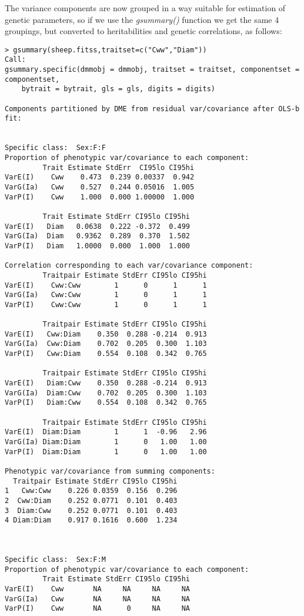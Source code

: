 \documentclass[titlepage]{article}  %
\begin{document}
The variance components are now grouped in a way suitable for estimation of genetic parameters, so if we use the {\em gsummary()} function we get the same 4 groupings, but converted to heritabilities and genetic correlations, as follows:

\begin{verbatim}
> gsummary(sheep.fitss,traitset=c("Cww","Diam"))
Call:
gsummary.specific(dmmobj = dmmobj, traitset = traitset, componentset = componentset, 
    bytrait = bytrait, gls = gls, digits = digits)

Components partitioned by DME from residual var/covariance after OLS-b fit:


Specific class:  Sex:F:F 
Proportion of phenotypic var/covariance to each component:
         Trait Estimate StdErr  CI95lo CI95hi
VarE(I)    Cww    0.473  0.239 0.00337  0.942
VarG(Ia)   Cww    0.527  0.244 0.05016  1.005
VarP(I)    Cww    1.000  0.000 1.00000  1.000

         Trait Estimate StdErr CI95lo CI95hi
VarE(I)   Diam   0.0638  0.222 -0.372  0.499
VarG(Ia)  Diam   0.9362  0.289  0.370  1.502
VarP(I)   Diam   1.0000  0.000  1.000  1.000

Correlation corresponding to each var/covariance component:
         Traitpair Estimate StdErr CI95lo CI95hi
VarE(I)    Cww:Cww        1      0      1      1
VarG(Ia)   Cww:Cww        1      0      1      1
VarP(I)    Cww:Cww        1      0      1      1

         Traitpair Estimate StdErr CI95lo CI95hi
VarE(I)   Cww:Diam    0.350  0.288 -0.214  0.913
VarG(Ia)  Cww:Diam    0.702  0.205  0.300  1.103
VarP(I)   Cww:Diam    0.554  0.108  0.342  0.765

         Traitpair Estimate StdErr CI95lo CI95hi
VarE(I)   Diam:Cww    0.350  0.288 -0.214  0.913
VarG(Ia)  Diam:Cww    0.702  0.205  0.300  1.103
VarP(I)   Diam:Cww    0.554  0.108  0.342  0.765

         Traitpair Estimate StdErr CI95lo CI95hi
VarE(I)  Diam:Diam        1      1  -0.96   2.96
VarG(Ia) Diam:Diam        1      0   1.00   1.00
VarP(I)  Diam:Diam        1      0   1.00   1.00

Phenotypic var/covariance from summing components:
  Traitpair Estimate StdErr CI95lo CI95hi
1   Cww:Cww    0.226 0.0359  0.156  0.296
2  Cww:Diam    0.252 0.0771  0.101  0.403
3  Diam:Cww    0.252 0.0771  0.101  0.403
4 Diam:Diam    0.917 0.1616  0.600  1.234



Specific class:  Sex:F:M 
Proportion of phenotypic var/covariance to each component:
         Trait Estimate StdErr CI95lo CI95hi
VarE(I)    Cww       NA     NA     NA     NA
VarG(Ia)   Cww       NA     NA     NA     NA
VarP(I)    Cww       NA      0     NA     NA


\end{verbatim}
\end{document}
